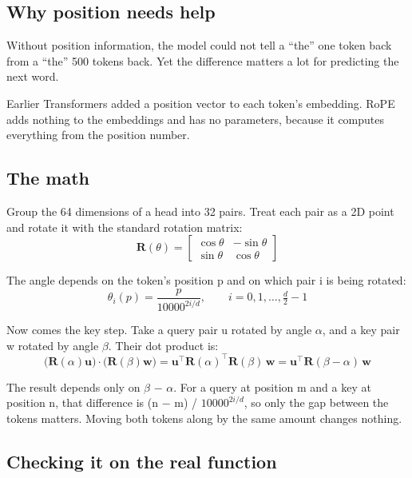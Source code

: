 \documentclass[11pt,a4paper]{article}
\begin{document}
\subsection*{Why position needs help}
{}

Without position information, the model could not tell a “the” one token back from a “the” 500 tokens back. Yet the difference matters a lot for predicting the next word.

Earlier Transformers added a position vector to each token's embedding. RoPE adds nothing to the embeddings and has no parameters, because it computes everything from the position number.

\subsection*{The math}
{}

Group the 64 dimensions of a head into 32 pairs. Treat each pair as a 2D point and rotate it with the standard rotation matrix:
\[
\mathbf{R}(\theta)=\begin{bmatrix}\cos\theta&-\sin\theta\\\sin\theta&\cos\theta\end{bmatrix}
\]

The angle depends on the token's position p and on which pair i is being rotated:
\[
\theta_i(p)=\frac{p}{10000^{2i/d}},\qquad i=0,1,\dots,\tfrac{d}{2}-1
\]

Now comes the key step. Take a query pair u rotated by angle $\alpha$, and a key pair w rotated by angle $\beta$. Their dot product is:
\[
\big(\mathbf{R}(\alpha)\mathbf{u}\big)\cdot\big(\mathbf{R}(\beta)\mathbf{w}\big)=\mathbf{u}^{\top}\mathbf{R}(\alpha)^{\top}\mathbf{R}(\beta)\,\mathbf{w}=\mathbf{u}^{\top}\mathbf{R}(\beta-\alpha)\,\mathbf{w}
\]

The result depends only on $\beta$ $-$ $\alpha$. For a query at position m and a key at position n, that difference is (n $-$ m) / $10000^{2i/d}$, so only the gap between the tokens matters. Moving both tokens along by the same amount changes nothing.

\subsection*{Checking it on the real function}
{}
\end{document}
